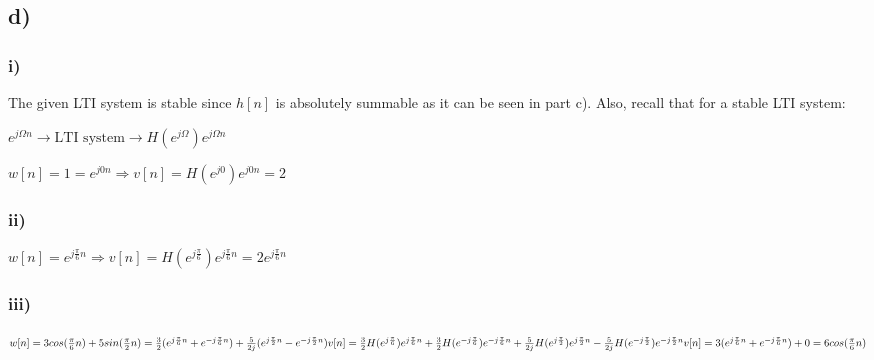 \documentclass[12pt]{article}
\begin{document}
    \subsection*{d)}
    \subsubsection*{i)}
    The given LTI system is stable since \(h[n]\) is absolutely summable as it can be seen in part c). Also, recall that for a stable LTI system:
    \begin{center}
\(e^{j\Omega n} \longrightarrow \boxed{\textrm{LTI system}} \longrightarrow H(e^{j \Omega}) e^{j\Omega n}\)
\end{center}
 \begin{math}
   w[n] = 1 = e^{j0n} \Rightarrow v[n] = H(e^{j0})e^{j0n} = 2 
    \end{math}
    \subsubsection*{ii)}
     \begin{math}
   w[n] = e^{j \frac{\pi}{6}n} \Rightarrow v[n] = H(e^{j\frac{\pi}{6}})e^{j \frac{\pi}{6}n}  = 2 e^{j \frac{\pi}{6}n}
    \end{math}
    \subsubsection*{iii)}
    \begin{math}
   w[n] = 3cos(\frac{\pi}{6} n) + 5sin(\frac{\pi}{2} n) = \frac{3}{2} (e^{j\frac{\pi}{6} n}+ e^{-j\frac{\pi}{6} n}) + \frac{5}{2j} (e^{j\frac{\pi}{2} n}-e^{-j\frac{\pi}{2} n})\\
   v[n] = \frac{3}{2} H(e^{j\frac{\pi}{6}})e^{j \frac{\pi}{6}n} + \frac{3}{2} H(e^{-j\frac{\pi}{6}}) e^{-j \frac{\pi}{6}n} + \frac{5}{2j} H(e^{j\frac{\pi}{2}})e^{j \frac{\pi}{2}n} - \frac{5}{2j} H(e^{-j\frac{\pi}{2}})e^{-j \frac{\pi}{2}n} \\
   v[n] = 3 (e^{j\frac{\pi}{6} n}+ e^{-j\frac{\pi}{6} n}) + 0 = 6cos(\frac{\pi}{6} n)
    \end{math}
\end{document}
